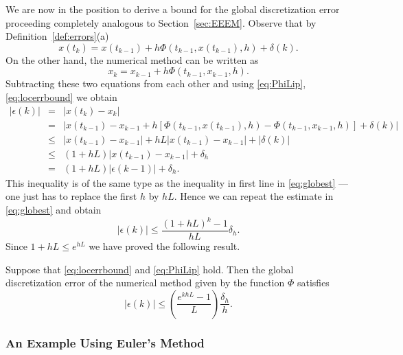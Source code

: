 \documentclass{ximera}
\begin{document}
We are now in the position to derive a bound for the global 
discretization error proceeding completely analogous to 
Section~\ref{sec:EEEM}.   Observe that by 
Definition~\ref{def:errors}(a)
\[
x(t_k) =  x(t_{k-1}) + h\Phi(t_{k-1},x(t_{k-1}),h)+\delta(k).
\]
On the other hand, the numerical method can be written as
\[
x_k = x_{k-1} + h\Phi(t_{k-1},x_{k-1},h).
\]
Subtracting these two equations from each other and using \eqref{eq:PhiLip},
\eqref{eq:locerrbound} we obtain
\begin{eqnarray*}
|\epsilon(k)| &=& |x(t_k)-x_k|\\
&=& |x(t_{k-1})-x_{k-1} + h[\Phi(t_{k-1},x(t_{k-1}),h)-
\Phi(t_{k-1},x_{k-1},h)]
+\delta(k)|\\
&\le& |x(t_{k-1})-x_{k-1}|+hL|x(t_{k-1})-x_{k-1}|+|\delta(k)|\\
&\le& (1+hL)|x(t_{k-1})-x_{k-1}|+\delta_h\\
&=& (1+hL)|\epsilon(k-1)|+\delta_h.
\end{eqnarray*}
This inequality is of the same type as the inequality in first line in
\eqref{eq:globest} --- one just has to replace the first $h$ by $hL$.
Hence we can repeat the estimate in \eqref{eq:globest} and obtain
\[
|\epsilon(k)| \le \frac{(1+hL)^k -1}{hL}\delta_h.
\]
Since $1+hL\le e^{hL}$ we have proved the following result.
\begin{theorem} \label{prop:glerr}
Suppose that \eqref{eq:locerrbound} and \eqref{eq:PhiLip} hold.  Then the
global discretization error of the numerical method given
by the function $\Phi$ satisfies 
\begin{equation} \label{eq:geestimate}
|\epsilon(k)| \le \left(\frac{e^{khL}-1}{L}\right)\frac{\delta_h}{h}.
\end{equation}
\end{theorem}

\subsubsection*{An Example Using Euler's Method}
\end{document}
